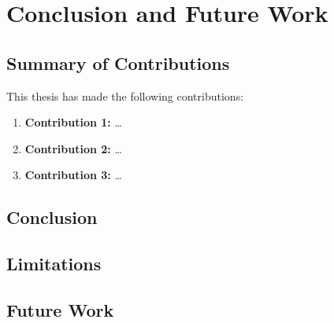 
\chapter{Conclusion and Future Work}
\label{ch:conclusion}

\section{Summary of Contributions}
\label{sec:summary}

This thesis has made the following contributions:

\begin{enumerate}
  \item \textbf{Contribution 1:} \ldots
  \item \textbf{Contribution 2:} \ldots
  \item \textbf{Contribution 3:} \ldots
\end{enumerate}

\section{Conclusion}
\label{sec:concl}

\section{Limitations}
\label{sec:limitations}

\section{Future Work}
\label{sec:future}
